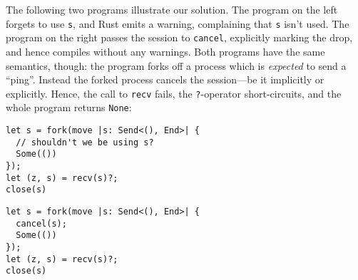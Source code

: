 \documentclass[copyright,creativecommons]{eptcs}
\begin{document}
The following two programs illustrate our solution. The program on the left forgets to use \lstinline{s}, and Rust emits a warning, complaining that \lstinline{s} isn't used. The program on the right passes the session to \lstinline{cancel}, explicitly marking the drop, and hence compiles without any warnings. Both programs have the same semantics, though: the program forks off a process which is \emph{expected} to send a ``ping''. Instead the forked process cancels the session---be it implicitly or explicitly. Hence, the call to \lstinline{recv} fails, the \lstinline{?}-operator short-circuits, and the whole program returns \lstinline{None}:

\vspace{-0.5\baselineskip}
\begin{minipage}[t]{0.5\linewidth}
\begin{lstlisting}
let s = fork(move |s: Send<(), End>| {
  // shouldn't we be using s?
  Some(())
});
let (z, s) = recv(s)?;
close(s)
\end{lstlisting}
\end{minipage}%
\begin{minipage}[t]{0.5\linewidth}
\begin{lstlisting}
let s = fork(move |s: Send<(), End>| {
  cancel(s);
  Some(())
});
let (z, s) = recv(s)?;
close(s)
\end{lstlisting}
\end{minipage}%
\end{document}
